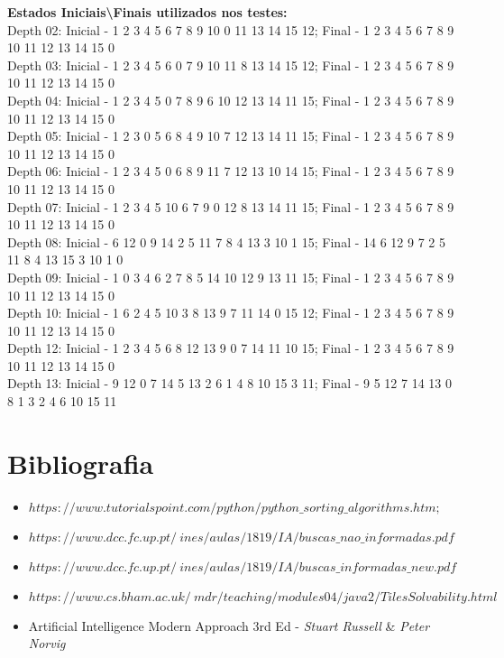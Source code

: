 \documentclass{article}
\begin{document}
\textbf{Estados Iniciais\textbackslash Finais utilizados nos testes:}\\[2mm]
Depth 02: Inicial - 1 2 3 4 5 6 7 8 9 10 0 11 13 14 15 12; Final - 1 2 3 4 5 6 7 8 9 10 11 12 13 14 15 0\\
Depth 03: Inicial - 1 2 3 4 5 6 0 7 9 10 11 8 13 14 15 12; Final - 1 2 3 4 5 6 7 8 9 10 11 12 13 14 15 0\\
Depth 04: Inicial - 1 2 3 4 5 0 7 8 9 6 10 12 13 14 11 15; Final - 1 2 3 4 5 6 7 8 9 10 11 12 13 14 15 0\\
Depth 05: Inicial - 1 2 3 0 5 6 8 4 9 10 7 12 13 14 11 15; Final - 1 2 3 4 5 6 7 8 9 10 11 12 13 14 15 0\\
Depth 06: Inicial - 1 2 3 4 5 0 6 8 9 11 7 12 13 10 14 15; Final - 1 2 3 4 5 6 7 8 9 10 11 12 13 14 15 0\\
Depth 07: Inicial - 1 2 3 4 5 10 6 7 9 0 12 8 13 14 11 15; Final - 1 2 3 4 5 6 7 8 9 10 11 12 13 14 15 0\\
Depth 08: Inicial - 6 12 0 9 14 2 5 11 7 8 4 13 3 10 1 15; Final - 14 6 12 9 7 2 5 11 8 4 13 15 3 10 1 0\\
Depth 09: Inicial - 1 0 3 4 6 2 7 8 5 14 10 12 9 13 11 15; Final - 1 2 3 4 5 6 7 8 9 10 11 12 13 14 15 0\\
Depth 10: Inicial - 1 6 2 4 5 10 3 8 13 9 7 11 14 0 15 12; Final - 1 2 3 4 5 6 7 8 9 10 11 12 13 14 15 0\\
Depth 12: Inicial - 1 2 3 4 5 6 8 12 13 9 0 7 14 11 10 15; Final - 1 2 3 4 5 6 7 8 9 10 11 12 13 14 15 0\\
Depth 13: Inicial - 9 12 0 7 14 5 13 2 6 1 4 8 10 15 3 11; Final - 9 5 12 7 14 13 0 8 1 3 2 4 6 10 15 11


\section{Bibliografia}
\begin{itemize}
  \item[\textbullet]{$https://www.tutorialspoint.com/python/python\_sorting\_algorithms.htm;$}
  \item[\textbullet]{$https://www.dcc.fc.up.pt/~ines/aulas/1819/IA/buscas\_nao\_informadas.pdf$}
  \item[\textbullet]{$https://www.dcc.fc.up.pt/~ines/aulas/1819/IA/buscas\_informadas\_new.pdf$}
  \item[\textbullet]{$https://www.cs.bham.ac.uk/~mdr/teaching/modules04/java2/TilesSolvability.html$}
  \item[\textbullet]{Artificial Intelligence Modern Approach 3rd Ed - \textit{Stuart Russell} \& \textit{Peter Norvig}}
\end{itemize}
\end{document}
